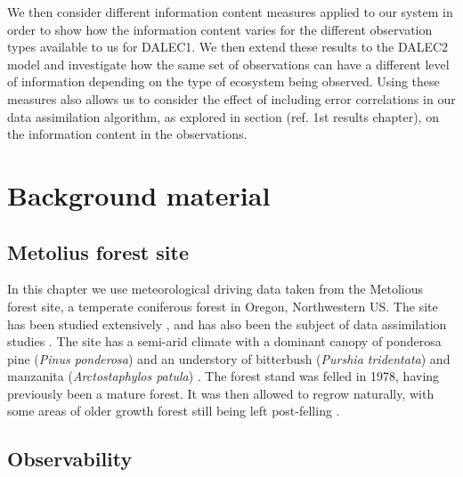 \documentclass[11pt]{article}
\begin{document}
We then consider different information content measures applied to our system in order to show how the information content varies for the different observation types available to us for DALEC1. We then extend these results to the DALEC2 model and investigate how the same set of observations can have a different level of information depending on the type of ecosystem being observed. Using these measures also allows us to consider the effect of including error correlations in our data assimilation algorithm, as explored in section ({\color{red}ref. 1st results chapter}), on the information content in the observations.

\section{Background material}

\subsection{Metolius forest site} \label{sec:oregon}
In this chapter we use meteorological driving data taken from the Metolious forest site, a temperate coniferous forest in Oregon, Northwestern US. The site has been studied extensively \citep{law2001carbon}, and has also been the subject of data assimilation studies \citep{williams2005improved, Quaife2008}. The site has a semi-arid climate with a dominant canopy of ponderosa pine (\textit{Pinus ponderosa}) and an understory of bitterbush (\textit{Purshia tridentata}) and manzanita (\textit{Arctostaphylos patula}) \citep{law2001estimation}. The forest stand was felled in 1978, having previously been a mature forest. It was then allowed to regrow naturally, with some areas of older growth forest still being left post-felling \citep{williams2005improved}.

\subsection{Observability}
\end{document}
